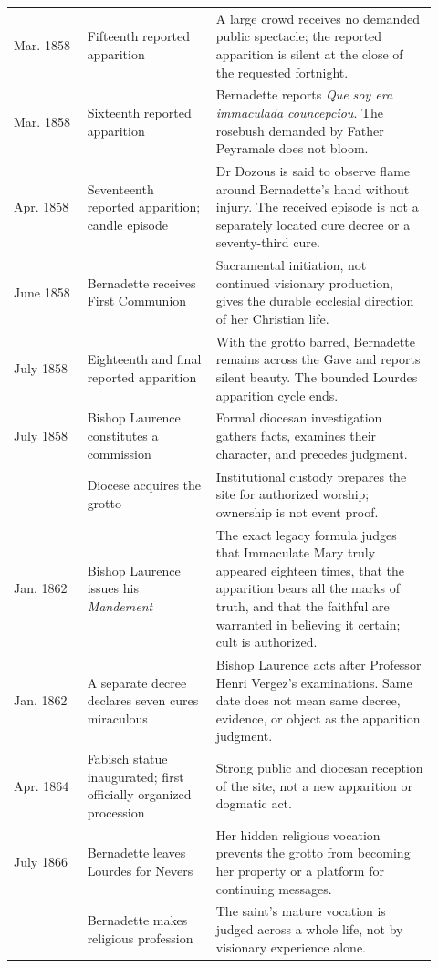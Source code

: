 \begin{longtable}{>{\bfseries\raggedright\arraybackslash}p{0.16\linewidth}>{\raggedright\arraybackslash}p{0.28\linewidth}>{\raggedright\arraybackslash}p{0.48\linewidth}}
4 Mar. 1858 & Fifteenth reported apparition & A large crowd receives no demanded public spectacle; the reported apparition is silent at the close of the requested fortnight.\\
25 Mar. 1858 & Sixteenth reported apparition & Bernadette reports \emph{Que soy era immaculada councepciou}. The rosebush demanded by Father Peyramale does not bloom.\\
7 Apr. 1858 & Seventeenth reported apparition; candle episode & Dr Dozous is said to observe flame around Bernadette's hand without injury. The received episode is not a separately located cure decree or a seventy-third cure.\\
3 June 1858 & Bernadette receives First Communion & Sacramental initiation, not continued visionary production, gives the durable ecclesial direction of her Christian life.\\
16 July 1858 & Eighteenth and final reported apparition & With the grotto barred, Bernadette remains across the Gave and reports silent beauty. The bounded Lourdes apparition cycle ends.\\
28 July 1858 & Bishop Laurence constitutes a commission & Formal diocesan investigation gathers facts, examines their character, and precedes judgment.\\
1861 & Diocese acquires the grotto & Institutional custody prepares the site for authorized worship; ownership is not event proof.\\
18 Jan. 1862 & Bishop Laurence issues his \emph{Mandement} & The exact legacy formula judges that Immaculate Mary truly appeared eighteen times, that the apparition bears all the marks of truth, and that the faithful are warranted in believing it certain; cult is authorized.\\
18 Jan. 1862 & A separate decree declares seven cures miraculous & Bishop Laurence acts after Professor Henri Vergez's examinations. Same date does not mean same decree, evidence, or object as the apparition judgment.\\
4 Apr. 1864 & Fabisch statue inaugurated; first officially organized procession & Strong public and diocesan reception of the site, not a new apparition or dogmatic act.\\
4 July 1866 & Bernadette leaves Lourdes for Nevers & Her hidden religious vocation prevents the grotto from becoming her property or a platform for continuing messages.\\
1867 & Bernadette makes religious profession & The saint's mature vocation is judged across a whole life, not by visionary experience alone.\\

\end{longtable}
